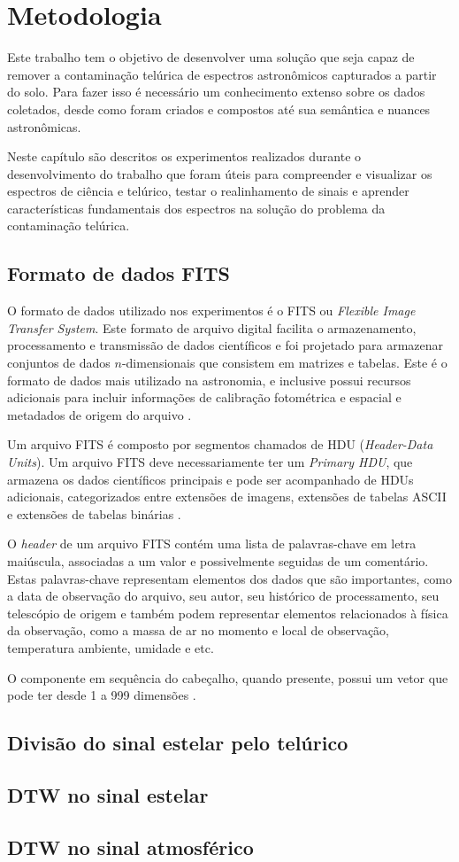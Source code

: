 \chapter{Metodologia}
\label{cap:desenvolvimentos}

Este trabalho tem o objetivo de desenvolver uma solução que seja capaz de remover a contaminação telúrica de espectros astronômicos capturados a partir do solo. Para fazer isso é necessário um conhecimento extenso sobre os dados coletados, desde como foram criados e compostos até sua semântica e nuances astronômicas.  

Neste capítulo são descritos os experimentos realizados durante o desenvolvimento do trabalho que foram úteis para compreender e visualizar os espectros de ciência e telúrico, testar o realinhamento de sinais e aprender características fundamentais dos espectros na solução do problema da contaminação telúrica.  

\section{Formato de dados FITS}

O formato de dados utilizado nos experimentos é o FITS ou \textit{Flexible Image Transfer System}. Este formato de arquivo digital facilita o armazenamento, processamento e transmissão de dados científicos e foi projetado para armazenar conjuntos de dados $n$-dimensionais que consistem em matrizes e tabelas. Este é o formato de dados mais utilizado na astronomia, e inclusive possui recursos adicionais para incluir informações de calibração fotométrica e espacial e metadados de origem do arquivo \citep{pence2010definition}.

Um arquivo FITS é composto por segmentos chamados de HDU (\textit{Header-Data Units}). Um arquivo FITS deve necessariamente ter um \textit{Primary HDU}, que armazena os dados científicos principais e pode ser acompanhado de HDUs adicionais, categorizados entre extensões de imagens, extensões de tabelas ASCII e extensões de tabelas binárias \citep{nasa-fits}.

O \textit{header} de um arquivo FITS contém uma lista de palavras-chave em letra maiúscula, associadas a um valor e possivelmente seguidas de um comentário. Estas palavras-chave representam elementos dos dados que são importantes, como a data de observação do arquivo, seu autor, seu histórico de processamento, seu telescópio de origem e também podem representar elementos relacionados à física da observação, como a massa de ar no momento e local de observação, temperatura ambiente, umidade e etc.

O componente em sequência do cabeçalho, quando presente, possui um vetor que pode ter desde 1 a 999 dimensões \citep{pence2010definition}. 

\section{Divisão do sinal estelar pelo telúrico}

\section{DTW no sinal estelar}

\section{DTW no sinal atmosférico}